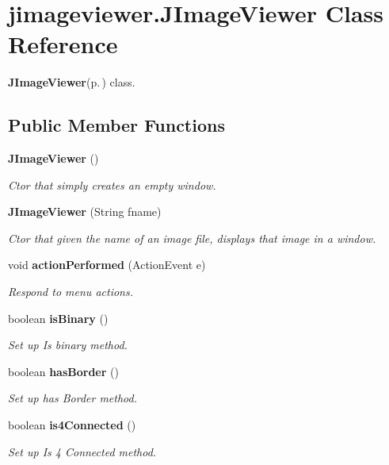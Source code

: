\section{jimageviewer.JImage\-Viewer Class Reference}
\label{classjimageviewer_1_1_j_image_viewer}
{\bf JImage\-Viewer}{\rm (p.\,\pageref{classjimageviewer_1_1_j_image_viewer})} class.  


\subsection*{Public Member Functions}
\begin{CompactItemize}
\item 
{\bf JImage\-Viewer} ()
\begin{CompactList}\small\item\em Ctor that simply creates an empty window. \item\end{CompactList}\item 
{\bf JImage\-Viewer} (String fname)
\begin{CompactList}\small\item\em Ctor that given the name of an image file, displays that image in a window. \item\end{CompactList}\item 
void {\bf action\-Performed} (Action\-Event e)
\begin{CompactList}\small\item\em Respond to menu actions. \item\end{CompactList}\item 
boolean {\bf is\-Binary} ()
\begin{CompactList}\small\item\em Set up Is binary method. \item\end{CompactList}\item 
boolean {\bf has\-Border} ()
\begin{CompactList}\small\item\em Set up has Border method. \item\end{CompactList}\item 
boolean {\bf is4Connected} ()
\begin{CompactList}\small\item\em Set up Is 4 Connected method. \item\end{CompactList}\item 

\end{CompactItemize}
